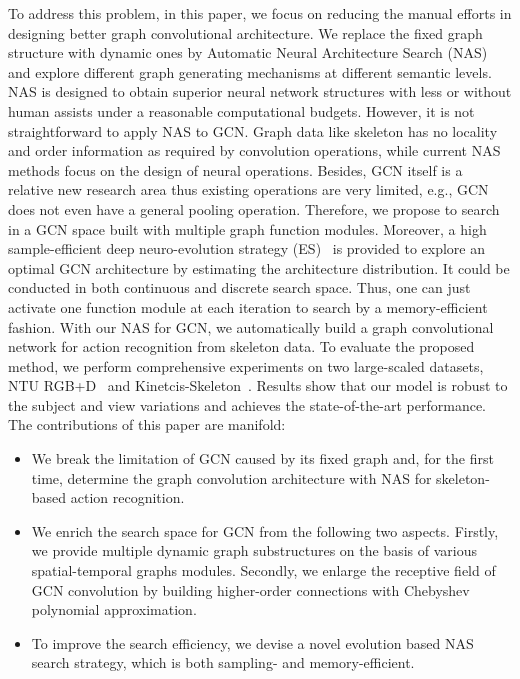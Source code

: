 \documentclass[letterpaper]{article} \usepackage{aaai19}  \usepackage{times}  \usepackage{helvet} \usepackage{courier}  \usepackage[hyphens]{url}  \usepackage{graphicx} \urlstyle{rm} \def\UrlFont{\rm}  \usepackage{graphicx}  \frenchspacing  \setlength{\pdfpagewidth}{8.5in}  \setlength{\pdfpageheight}{11in}
\begin{document}
To address this problem, in this paper, we focus on reducing the manual efforts in designing better graph convolutional architecture. We replace the fixed graph structure with dynamic ones by Automatic Neural Architecture Search (NAS)~\cite{zoph2016neural} and explore different graph generating mechanisms at different semantic levels. NAS is designed to obtain superior neural network structures with less or without human assists under a reasonable computational budgets. However, it is not straightforward to apply NAS to GCN. Graph data like skeleton has no locality and order information as required by convolution operations, while current NAS methods focus on the design of neural operations. Besides, GCN itself is a relative new research area thus existing operations are very limited, e.g., GCN does not even have a general pooling operation. Therefore, we propose to search in a GCN space built with multiple graph function modules. Moreover, a high sample-efficient deep neuro-evolution strategy (ES)~\cite{angeline1994evolutionary,miller1989designing} is provided to explore an optimal GCN architecture by estimating the architecture distribution. It could be conducted in both continuous and discrete search space. Thus, one can just activate one function module at each iteration to search by a memory-efficient fashion. With our NAS for GCN, we automatically build a graph convolutional network for action recognition from skeleton data. {To evaluate the proposed method, we perform comprehensive experiments on two large-scaled datasets, NTU RGB+D~\cite{shahroudy2016ntu} and Kinetcis-Skeleton~\cite{kay2017kinetics,yan2018stgan}. Results show that our model is robust to the subject and view variations and achieves the state-of-the-art performance.} The contributions of this paper are manifold:
\begin{itemize}
    \item {We break the limitation of GCN caused by its fixed graph and, for the first time, determine the graph convolution architecture with NAS for skeleton-based action recognition.}
\item {We enrich the search space for GCN from the following two aspects. Firstly, we provide multiple dynamic graph substructures on the basis of various spatial-temporal graphs modules. Secondly, we enlarge the receptive field of GCN convolution by building higher-order connections with Chebyshev polynomial approximation.}  
    \item {To improve the search efficiency, we devise a novel evolution based NAS search strategy, which is both sampling- and memory-efficient.}    




\end{itemize}
\end{document}
